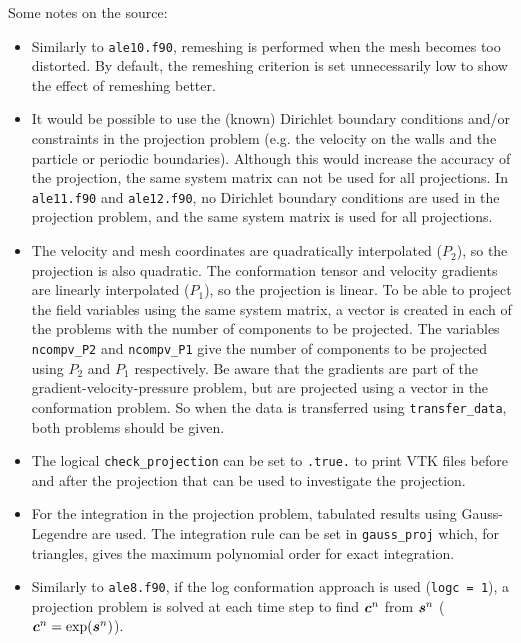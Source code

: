 Some notes on the source:
\begin{itemize}
   \item Similarly to \texttt{ale10.f90}, remeshing is performed when the
     mesh becomes too distorted. By default, the remeshing criterion is set unnecessarily low
     to show the effect of remeshing better.
   \item It would be possible to use the (known) Dirichlet boundary conditions
     and/or constraints in the
     projection problem (e.g. the velocity on the walls and the particle or periodic boundaries).
     Although this would increase the accuracy of the projection, the same system
     matrix can not be used for all projections. In \texttt{ale11.f90} and
     \texttt{ale12.f90}, no Dirichlet
     boundary conditions are used in the projection problem, and the same system matrix
     is used for all projections.
   \item The velocity and mesh coordinates are quadratically interpolated ($P_2$),
     so the projection is also quadratic. The conformation tensor and velocity gradients
     are linearly interpolated ($P_1$), so the projection is linear. To be able to project the 
     field variables using the same system matrix, a vector is created in each of the problems
     with the number of components to be projected. The variables \texttt{ncompv\_P2} and
     \texttt{ncompv\_P1} give the number of components to be projected using $P_2$ and $P_1$
     respectively. Be aware that the gradients are part of the 
     gradient-velocity-pressure problem, but are projected using a vector in the
     conformation problem. So when the data is transferred using \texttt{transfer\_data},
     both problems should be given.
   \item The logical \texttt{check\_projection} can be set to \texttt{.true.} to print VTK
    files before and after the projection that can be used to investigate the projection.
   \item For the integration in the projection problem, tabulated
    results using Gauss-Legendre are used. The integration rule can be set in 
    \texttt{gauss\_proj}
    which, for triangles, gives the maximum polynomial order for exact integration. 
\item Similarly to \texttt{ale8.f90}, if the log conformation approach is used (\texttt{logc = 1}), a
  projection problem is solved at each time step to find $\boldsymbol{c}^n$ from $\boldsymbol{s}^n$
  ($\boldsymbol{c}^n = \exp({\boldsymbol{s}^n})$).
\end{itemize}

